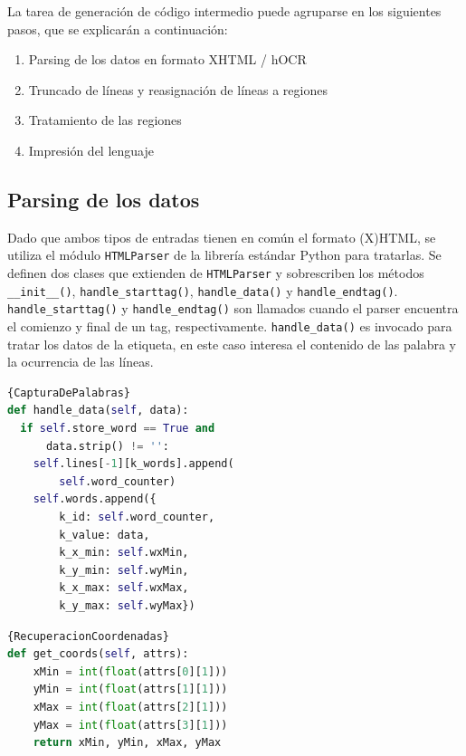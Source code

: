La tarea de generación de código intermedio puede agruparse en los siguientes pasos, que se explicarán a continuación:

\begin{enumerate}
    \item Parsing de los datos en formato XHTML / hOCR
    \item Truncado de líneas y reasignación de líneas a regiones
    \item Tratamiento de las regiones
    \item Impresión del lenguaje
\end{enumerate}    

\subsection{Parsing de los datos}

Dado que ambos tipos de entradas tienen en común el formato (X)HTML, se utiliza el módulo \verb|HTMLParser| de la librería estándar Python para tratarlas. Se definen dos clases que extienden de \verb|HTMLParser| y sobrescriben los métodos \verb|__init__()|, \verb|handle_starttag()|, \verb|handle_data()| y \verb|handle_endtag()|. \verb|handle_starttag()| y \verb|handle_endtag()| son llamados cuando el parser encuentra el comienzo y final de un tag, respectivamente. \verb|handle_data()| es invocado para tratar los datos de la etiqueta, en este caso interesa el contenido de las palabra y la ocurrencia de las líneas.

\noindent\begin{minipage}{.45\textwidth}
    \begin{lstlisting}[language=Python,caption=Captura de las palabras.,frame=tlrb,label={lst:captura-de-palabras}]{CapturaDePalabras}
def handle_data(self, data):
  if self.store_word == True and 
      data.strip() != '':
    self.lines[-1][k_words].append(
        self.word_counter)
    self.words.append({
        k_id: self.word_counter,
        k_value: data,
        k_x_min: self.wxMin,
        k_y_min: self.wyMin,
        k_x_max: self.wxMax,
        k_y_max: self.wyMax})
    \end{lstlisting}
\end{minipage}\hfill
\begin{minipage}{.45\textwidth}
    \begin{lstlisting}[language=Python,caption=Recuperación de coordenadas.,frame=tlrb,label={lst:recuperacion-coordenadas}]{RecuperacionCoordenadas}
def get_coords(self, attrs):
    xMin = int(float(attrs[0][1]))
    yMin = int(float(attrs[1][1]))
    xMax = int(float(attrs[2][1]))
    yMax = int(float(attrs[3][1]))
    return xMin, yMin, xMax, yMax
    \end{lstlisting}
\end{minipage}

